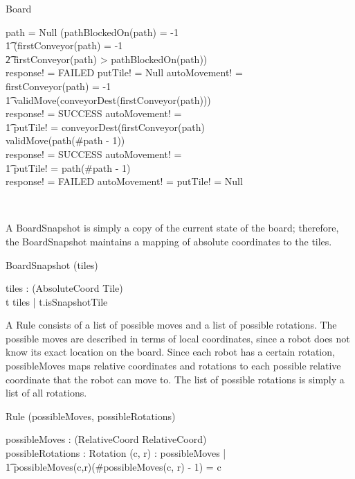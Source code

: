 \documentclass[12pt]{article}
\begin{document}
\begin{class}{Board}
\begin{notopschema}
\also \also \also \also
\IF path = Null \vee (pathBlockedOn(path) \not = -1 \; \;\wedge \\ \t1 (firstConveyor(path) = -1 \; \; \vee \\ \t2 firstConveyor(path) > pathBlockedOn(path)) \\
\THEN response! = FAILED \; \; \wedge putTile! = Null \wedge autoMovement! = \false \\
\ELSE \IF firstConveyor(path) \not = -1 \; \; \wedge \\ \t1 validMove(conveyorDest(firstConveyor(path))) \\
\THEN response! = SUCCESS \wedge autoMovement! = \true \;\; \wedge \\ \t1 putTile! = conveyorDest(firstConveyor(path) \\
\ELSE \IF validMove(path(\#path - 1)) \\
\THEN response! = SUCCESS \wedge autoMovement! = \false \; \; \wedge \\ \t1  putTile! = path(\#path - 1) \\
\ELSE response! = FAILED \wedge autoMovement! = \false \wedge putTile! = Null
\end{notopschema} \\
\end{class}

A BoardSnapshot is simply a copy of the current state of the board; therefore, the BoardSnapshot maintains a mapping of absolute coordinates to the tiles.
\begin{class}{BoardSnapshot}
\upharpoonright (tiles) \\
\begin{state}
tiles : \power (AbsoluteCoord \fun Tile) \\
\where
\forall t \ran tiles | t.isSnapshotTile
\end{state}
\end{class}

A Rule consists of a list of possible moves and a list of possible rotations. The possible moves are described in terms of local coordinates, since a robot does not know its exact location on the board. Since each robot has a certain rotation, possibleMoves maps relative coordinates and rotations to each possible relative coordinate that the robot can move to. The list of possible rotations is simply a list of all rotations.
\begin{class}{Rule}
\upharpoonright (possibleMoves, possibleRotations) \\
\begin{state}
possibleMoves : \power (RelativeCoord \pfun \seq RelativeCoord) \\
possibleRotations : \power Rotation
\where
\forall (c, r) : \dom possibleMoves | \\ \t1 possibleMoves(c,r)(\#possibleMoves(c, r) - 1) = c
\end{state} \\
\end{class}
\end{document}
